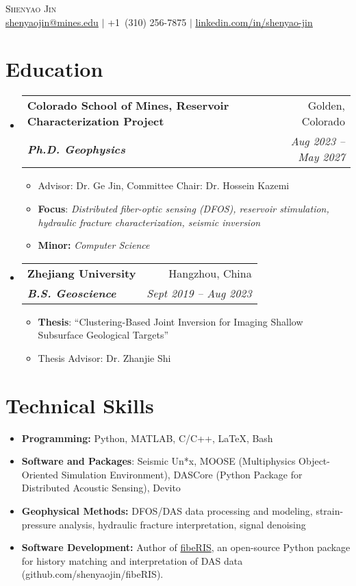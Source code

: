 \documentclass[letterpaper,13pt]{article}
\makeatletter
\newcommand{\resumeItem}[1]{\item\small{{#1 \vspace{-2pt}}}}
\newcommand{\resumeSubheading}[4]{
  \vspace{-2pt}\item
    \begin{tabular*}{0.97\textwidth}[t]{l@{\extracolsep{\fill}}r}
      \textbf{#1} & #2 \\
      \textit{\small#3} & \textit{\small #4} \\
    \end{tabular*}\vspace{-7pt}
}
\newcommand{\resumeItemListStart}{\begin{itemize}[label={\small$\bullet$}]}
\newcommand{\resumeItemListEnd}{\end{itemize}\vspace{-5pt}}
\newcommand{\resumeSubHeadingListStart}{\begin{itemize}[leftmargin=0.15in, label={}]}
\newcommand{\resumeSubHeadingListEnd}{\end{itemize}}
\makeatother
\begin{document}
\begin{center}
    {\Huge \scshape Shenyao Jin} \\ \vspace{1pt}
    \small \underline{shenyaojin@mines.edu} $|$ {+1\ (310) 256-7875} $|$ \href{https://www.linkedin.com/in/shenyao-jin/}{\underline{linkedin.com/in/shenyao-jin}} \\
\end{center}

\section{Education}
\resumeSubHeadingListStart

\resumeSubheading
  {Colorado School of Mines, Reservoir Characterization Project}{Golden, Colorado}
  {\textbf{Ph.D. Geophysics}}{Aug 2023 -- May 2027}
  \resumeItemListStart
    \resumeItem{Advisor: Dr. Ge Jin, Committee Chair: Dr. Hossein Kazemi}
    \resumeItem{\textbf{Focus}: \textit{Distributed fiber-optic sensing (DFOS), reservoir stimulation, hydraulic fracture characterization, seismic inversion}}
    \resumeItem{\textbf{Minor:} \textit{Computer Science}}
  \resumeItemListEnd

\resumeSubheading
  {Zhejiang University}{Hangzhou, China}
  {\textbf{B.S. Geoscience}}{Sept 2019 -- Aug 2023}
  \resumeItemListStart
    \resumeItem{\textbf{Thesis}: ``Clustering-Based Joint Inversion for Imaging Shallow Subsurface Geological Targets''}
    \resumeItem{Thesis Advisor: Dr. Zhanjie Shi}
  \resumeItemListEnd

\resumeSubHeadingListEnd

\section{Technical Skills}
\resumeItemListStart
\resumeItem{
  \textbf{Programming:} Python, MATLAB, C/C++, \LaTeX, Bash
}
\resumeItem{
  \textbf{Software and Packages}: Seismic Un*x, MOOSE (Multiphysics Object-Oriented Simulation Environment), DASCore (Python Package for Distributed Acoustic Sensing), Devito
}
\resumeItem{
  \textbf{Geophysical Methods:} DFOS/DAS data processing and modeling, strain-pressure analysis, hydraulic fracture interpretation, signal denoising
}
\resumeItem{\textbf{Software Development:} Author of \href{https://github.com/shenyaojin/fibeRIS}{fibeRIS}, an open-source Python package for history matching and interpretation of DAS data (github.com/shenyaojin/fibeRIS).}
\resumeItemListEnd
\end{document}
